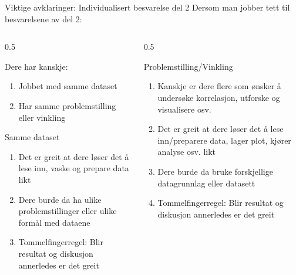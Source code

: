 \documentclass[aspectratio=169]{beamer}
\begin{document}
\begin{frame}{Viktige avklaringer: Individualisert besvarelse del 2}
   Dersom man jobber tett til besvarelsene av del 2:
   \small
   \begin{columns}
      \begin{column}{0.5\textwidth}
         \begin{block}{Dere har kanskje:}
            \begin{enumerate}[$\bullet$]
               \item {Jobbet med samme dataset}
               \item {Har samme problemstilling eller vinkling}
            \end{enumerate}
         \end{block}
         \begin{block}{Samme dataset}
           \begin{enumerate}[$\bullet$]
               \item {Det er greit at dere løser det å lese inn, vaske og prepare data likt}
               \item {Dere burde da ha ulike problemstillinger eller ulike formål med dataene}
               \item {Tommelfingerregel: Blir resultat og diskusjon annerledes er det greit}
            \end{enumerate}
         \end{block}
      \end{column}
      \begin{column}{0.5\textwidth}
         
         \begin{block}{Problemstilling/Vinkling}
            \begin{enumerate}[$\bullet$]
               \item {Kanskje er dere flere som ønsker å undersøke korrelasjon, utforske og visualisere osv.}
               \item {Det er greit at dere løser det å lese inn/preparere data, lager plot, kjører analyse osv. likt}
               \item {Dere burde da bruke forskjellige datagrunnlag eller datasett}
               \item {Tommelfingerregel: Blir resultat og diskusjon annerledes er det greit}
            \end{enumerate}
         \end{block}
      \end{column}
   \end{columns}
\end{frame}
\end{document}
